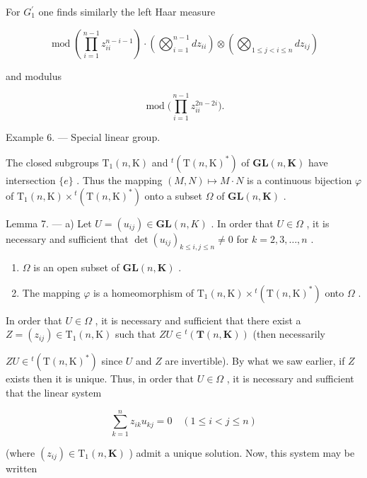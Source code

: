 For \(G_{1}^{\prime}\) one finds similarly the left Haar measure

\[
\operatorname{mod} \left(\prod_ {i = 1} ^ {n - 1} z _ {i i} ^ {n - i - 1}\right) \cdot \left(\bigotimes_ {i = 1} ^ {n - 1} d z _ {i i}\right) \otimes \left(\bigotimes_ {1 \leqslant j <   i \leqslant n} d z _ {i j}\right)
\]

and modulus

\[
\operatorname{mod} \biggl (\prod_ {i = 1} ^ {n - 1} z _ {i i} ^ {2 n - 2 i} \biggr).
\]

Example 6. --- Special linear group.

The closed subgroups \(\mathrm{T}_{1}(n,\mathrm{K})\) and \({}^{t}(\mathrm{T}(n,\mathrm{K})^{*})\) of \(\mathbf{GL}(n,\mathbf{K})\) have intersection \(\{e\}\) . Thus the mapping \((M,N)\mapsto M\cdot N\) is a continuous bijection \(\varphi\) of \(\mathrm{T}_{1}(n,\mathrm{K})\times{}^{t}(\mathrm{T}(n,\mathrm{K})^{*})\) onto a subset \(\Omega\) of \(\mathbf{GL}(n,\mathbf{K})\) .

Lemma 7. --- a) Let \(U = (u_{ij}) \in \mathbf{GL}(n, K)\) . In order that \(U \in \Omega\) , it is necessary and sufficient that \(\det(u_{ij})_{k \leqslant i,j \leqslant n} \neq 0\) for \(k = 2, 3, \ldots, n\) .

\begin{enumerate}
\def\labelenumi{\alph{enumi})}
\setcounter{enumi}{1}
\item
  \(\Omega\) is an open subset of \(\mathbf{GL}(n,\mathbf{K})\) .
\item
  The mapping \(\varphi\) is a homeomorphism of \(\mathrm{T}_1(n,\mathrm{K})\times {}^t (\mathrm{T}(n,\mathrm{K})^*)\) onto \(\Omega\) .
\end{enumerate}

In order that \(U \in \Omega\) , it is necessary and sufficient that there exist a \(Z = (z_{ij}) \in \mathrm{T}_1(n,\mathrm{K})\) such that \(ZU \in {}^t (\mathbf{T}(n,\mathbf{K}))\) (then necessarily

\(ZU \in {}^{t}(\mathrm{T}(n,\mathrm{K})^{*})\) since \(U\) and \(Z\) are invertible). By what we saw earlier, if \(Z\) exists then it is unique. Thus, in order that \(U \in \Omega\) , it is necessary and sufficient that the linear system

\[
\sum_ {k = 1} ^ {n} z _ {i k} u _ {k j} = 0 \quad (1 \leqslant i <   j \leqslant n)
\]

(where \((z_{ij})\in \mathrm{T}_1(n,\mathbf{K})\) ) admit a unique solution. Now, this system may be written

